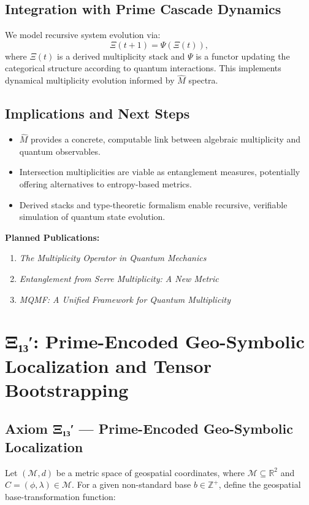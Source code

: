 \documentclass[12]{amsart}
\theoremstyle{plain}
\begin{document}
\subsection{Integration with Prime Cascade Dynamics}

We model recursive system evolution via:
\[
\Xi(t+1) = \Psi(\Xi(t)),
\]
where $\Xi(t)$ is a derived multiplicity stack and $\Psi$ is a functor updating the categorical structure according to quantum interactions. This implements dynamical multiplicity evolution informed by $\hat{M}$ spectra.

\subsection{Implications and Next Steps}

\begin{itemize}
  \item $\hat{M}$ provides a concrete, computable link between algebraic multiplicity and quantum observables.
  \item Intersection multiplicities are viable as entanglement measures, potentially offering alternatives to entropy-based metrics.
  \item Derived stacks and type-theoretic formalism enable recursive, verifiable simulation of quantum state evolution.
\end{itemize}

\textbf{Planned Publications:}
\begin{enumerate}
  \item \emph{The Multiplicity Operator in Quantum Mechanics}
  \item \emph{Entanglement from Serre Multiplicity: A New Metric}
  \item \emph{MQMF: A Unified Framework for Quantum Multiplicity}
\end{enumerate}

\section{Ξ₁₃′: Prime-Encoded Geo-Symbolic Localization and Tensor Bootstrapping}

\subsection{Axiom Ξ₁₃′ — Prime-Encoded Geo-Symbolic Localization}

Let $(\mathcal{M}, d)$ be a metric space of geospatial coordinates, where $\mathcal{M} \subseteq \mathbb{R}^2$ and $C = (\phi, \lambda) \in \mathcal{M}$. For a given non-standard base $b \in \mathbb{Z}^+$, define the geospatial base-transformation function:
\end{document}
